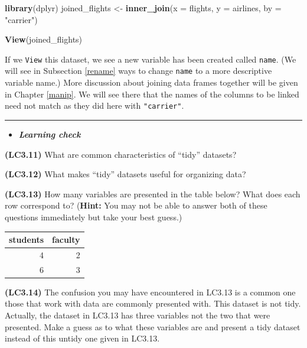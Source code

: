 \documentclass[]{tufte-book}
\newenvironment{Shaded}{\begin{snugshade}}{\end{snugshade}}
\newcommand{\KeywordTok}[1]{\textcolor[rgb]{0.13,0.29,0.53}{\textbf{{#1}}}}
\newcommand{\DataTypeTok}[1]{\textcolor[rgb]{0.13,0.29,0.53}{{#1}}}
\newcommand{\StringTok}[1]{\textcolor[rgb]{0.31,0.60,0.02}{{#1}}}
\newcommand{\NormalTok}[1]{{#1}}
\let\oldrule=\rule
\renewcommand{\rule}[1]{\oldrule{\linewidth}}
\newenvironment{rmdblock}[1]
  {\begin{shaded*}
  \begin{itemize}
  \renewcommand{\labelitemi}{
    \raisebox{-.7\height}[0pt][0pt]{
    }
  }
  \item
  }
  {
  \end{itemize}
  \end{shaded*}
  }
\newenvironment{learncheck}
  {\begin{rmdblock}{warning}}
  {\end{rmdblock}}
\theoremstyle{definition}
\theoremstyle{definition}
\theoremstyle{remark}
\begin{document}
\begin{Shaded}
\begin{Highlighting}[]
\KeywordTok{library}\NormalTok{(dplyr)}
\NormalTok{joined_flights <-}\StringTok{ }\KeywordTok{inner_join}\NormalTok{(}\DataTypeTok{x =} \NormalTok{flights, }\DataTypeTok{y =} \NormalTok{airlines, }\DataTypeTok{by =} \StringTok{"carrier"}\NormalTok{)}
\end{Highlighting}
\end{Shaded}

\begin{Shaded}
\begin{Highlighting}[]
\KeywordTok{View}\NormalTok{(joined_flights)}
\end{Highlighting}
\end{Shaded}

If we \texttt{View} this dataset, we see a new variable has been created
called \texttt{name}. (We will see in Subsection \ref{rename} ways to
change \texttt{name} to a more descriptive variable name.) More
discussion about joining data frames together will be given in Chapter
\ref{manip}. We will see there that the names of the columns to be
linked need not match as they did here with \texttt{"carrier"}.

\begin{center}\rule{0.5\linewidth}{\linethickness}\end{center}

\begin{learncheck}
\textbf{\emph{Learning check}}
\end{learncheck}

\textbf{(LC3.11)} What are common characteristics of ``tidy'' datasets?

\textbf{(LC3.12)} What makes ``tidy'' datasets useful for organizing
data?

\textbf{(LC3.13)} How many variables are presented in the table below?
What does each row correspond to? (\textbf{Hint:} You may not be able to
answer both of these questions immediately but take your best guess.)

\begin{tabular}{r|r}
\hline
students & faculty\\
\hline
4 & 2\\
\hline
6 & 3\\
\hline
\end{tabular}

\textbf{(LC3.14)} The confusion you may have encountered in LC3.13 is a
common one those that work with data are commonly presented with. This
dataset is not tidy. Actually, the dataset in LC3.13 has three variables
not the two that were presented. Make a guess as to what these variables
are and present a tidy dataset instead of this untidy one given in
LC3.13.
\end{document}
